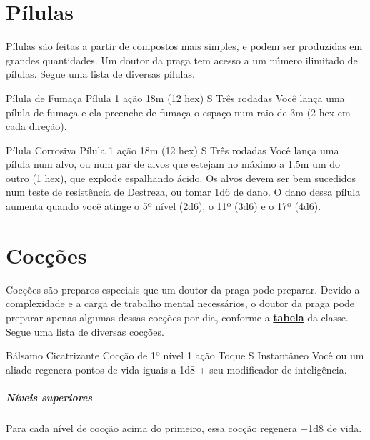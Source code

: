 \documentclass[letterpaper,twocolumn,openany]{dndbook}
\begin{document}
	\section{Pílulas}
	\label{sec:pilulas}
	Pílulas são feitas a partir de compostos mais simples, e podem ser produzidas em grandes quantidades. Um doutor da praga tem acesso a um número ilimitado de pílulas. Segue uma lista de diversas pílulas.
	
	\spellheader%
	{Pílula de Fumaça}
	{Pílula}
	{1 ação}
	{18m (12 hex)}
	{S}
	{Três rodadas}
	Você lança uma pílula de fumaça e ela preenche de fumaça o espaço num raio de 3m (2 hex em cada direção).
	
	\spellheader%
	{Pílula Corrosiva}
	{Pílula}
	{1 ação}
	{18m (12 hex)}
	{S}
	{Três rodadas}
	Você lança uma pílula num alvo, ou num par de alvos que estejam no máximo a 1.5m um do outro (1 hex), que explode espalhando ácido. Os alvos devem ser bem sucedidos num teste de resistência de Destreza, ou tomar 1d6 de dano. O dano dessa pílula aumenta quando você atinge o 5º nível (2d6), o 11º (3d6) e o 17º (4d6).
	
	\section{Cocções}
	Cocções são preparos especiais que um doutor da praga pode preparar. Devido a complexidade e a carga de trabalho mental necessários, o doutor da praga pode preparar apenas algumas dessas cocções por dia, conforme a \hyperref[tab:doutor_da_praga]{\textbf{tabela}} da classe.
	Segue uma lista de diversas cocções.
	
	\spellheader%
	{Bálsamo Cicatrizante}
	{Cocção de 1º nível}
	{1 ação}
	{Toque}
	{S}
	{Instantâneo}
	Você ou um aliado regenera pontos de vida iguais a 1d8 + seu modificador de inteligência.
	\subparagraph{Níveis superiores} Para cada nível de cocção acima do primeiro, essa cocção regenera +1d8 de vida.
	
\end{document}
